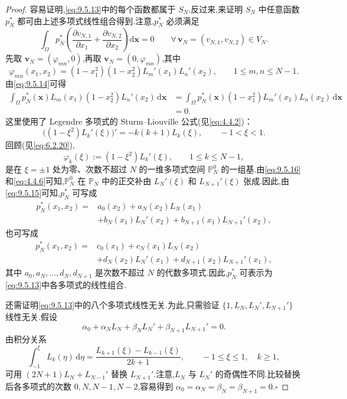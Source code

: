 \begin{proof}
容易证明,\eqref{eq:9.5.13}中的每个函数都属于 \(S_N\).反过来,来证明 \(S_N\) 中任意函数 \(p_N^*\) 都可由上述多项式线性组合得到.注意,\(p_N^*\) 必须满足
\begin{equation}\label{eq:9.5.14}
  \int_\Omega p_N^*\left(\frac{\partial v_{N,1}}{\partial x_1}
                       +\frac{\partial v_{N,2}}{\partial x_2}\right)\mathrm d\boldsymbol{x}=0
        \qquad\forall\,\boldsymbol{v}_N=(v_{N,1},v_{N,2})\in V_N .
\end{equation}
先取 \(\boldsymbol{v}_N=(\varphi_{mn},0)\),再取 \(\boldsymbol{v}_N=(0,\varphi_{mn})\),其中
\[
  \varphi_{mn}(x_1,x_2)=(1-x_1^2)(1-x_2^2)L_m'(x_1)L_n'(x_2),
       \qquad1\le m,n\le N-1.
\]
由\eqref{eq:9.5.14}可得
\begin{equation}\label{eq:9.5.15}
  \begin{aligned}
    \int_\Omega p_N^*(\boldsymbol{x})L_m(x_1)(1-x_2^2)L_n'(x_2)\,\mathrm d\boldsymbol{x}
      &=\int_\Omega p_N^*(\boldsymbol{x})(1-x_1^2)L_m'(x_1)L_n(x_2)\,\mathrm d\boldsymbol{x}\\
      &=0 .
  \end{aligned}
\end{equation}
这里使用了 Legendre 多项式的 Sturm--Liouville 公式(见\eqref{eq:4.4.2})：
\begin{equation}\label{eq:9.5.16}
  \bigl((1-\xi^2)L_k'(\xi)\bigr)'=-k(k+1)L_k(\xi),\qquad -1<\xi<1.
\end{equation}
回顾(见\eqref{eq:6.2.20}),
\begin{equation}\label{eq:9.5.17}
  \varphi_k(\xi):=(1-\xi^2)L_k'(\xi),\qquad1\le k\le N-1,
\end{equation}
是在 \(\xi=\pm1\) 处为零、次数不超过 \(N\) 的一维多项式空间 \(\mathbb P_N^0\) 的一组基.由\eqref{eq:9.5.16}和\eqref{eq:4.4.6}可知,\(\mathbb P_N^0\) 在 \(\mathbb P_N\) 中的正交补由 \(L_N'(\xi)\) 和 \(L_{N+1}'(\xi)\) 张成.因此,由\eqref{eq:9.5.15}可知,\(p_N^*\) 可写成
\[
  \begin{aligned}
    p_N^*(x_1,x_2)={}&a_0(x_2)+a_N(x_2)L_N(x_1)\\
           &+b_N(x_1)L_N'(x_2)+b_{N+1}(x_1)L_{N+1}'(x_2),
  \end{aligned}
\]
也可写成
\[
  \begin{aligned}
    p_N^*(x_1,x_2)={}&c_0(x_1)+c_N(x_1)L_N(x_2)\\
           &+d_N(x_2)L_N'(x_1)+d_{N+1}(x_2)L_{N+1}'(x_1),
  \end{aligned}
\]
其中 \(a_0,a_N,\ldots,d_N,d_{N+1}\) 是次数不超过 \(N\) 的代数多项式.因此,\(p_N^*\) 可表示为\eqref{eq:9.5.13}中各多项式的线性组合.

还需证明\eqref{eq:9.5.13}中的八个多项式线性无关.为此,只需验证 \(\{1,L_N,L_N',L_{N+1}'\}\) 线性无关.假设
\[
  \alpha_0+\alpha_NL_N+\beta_NL_N'+\beta_{N+1}L_{N+1}'=0.
\]
由积分关系
\[
  \int_{-1}^{\xi}L_k(\eta)\,\mathrm d\eta
    =\frac{L_{k+1}(\xi)-L_{k-1}(\xi)}{2k+1},\qquad -1\le\xi\le1,\quad k\ge1,
\]
可用 \((2N+1)L_N+L_{N-1}'\) 替换 \(L_{N+1}'\).注意,\(L_N\) 与 \(L_N'\) 的奇偶性不同.比较替换后各多项式的次数 \(0,N,N-1,N-2\),容易得到
\(\alpha_0=\alpha_N=\beta_N=\beta_{N+1}=0\).\hfill\(\square\)
\end{proof}

